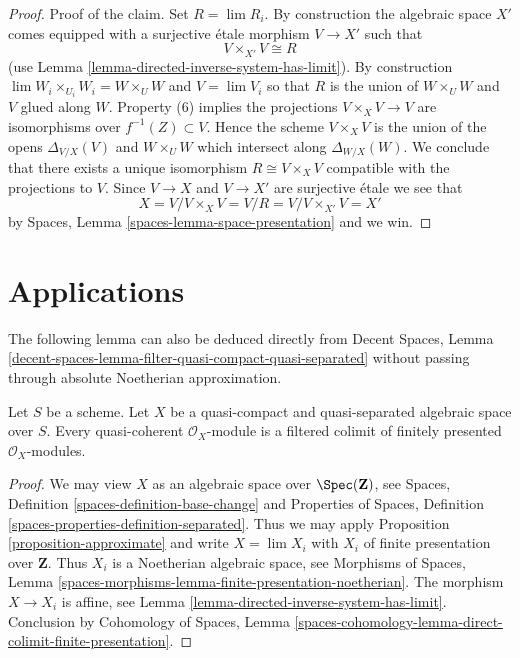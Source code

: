 \begin{proof}
\medskip\noindent
Proof of the claim. Set $R = \lim R_i$.
By construction the algebraic space $X'$ comes
equipped with a surjective \'etale morphism $V \to X'$ such that
$$
V \times_{X'} V \cong R
$$
(use Lemma \ref{lemma-directed-inverse-system-has-limit}).
By construction $\lim W_i \times_{U_i} W_i = W \times_U W$ and $V = \lim V_i$
so that $R$ is the union of $W \times_U W$ and $V$ glued along $W$.
Property (6) implies the projections $V \times_X V \to V$ are isomorphisms
over $f^{-1}(Z) \subset V$. Hence the scheme $V \times_X V$ is the union
of the opens $\Delta_{V/X}(V)$ and $W \times_U W$ which intersect
along $\Delta_{W/X}(W)$. We conclude that there exists a unique isomorphism
$R \cong V \times_X V$ compatible with the projections to $V$.
Since $V \to X$ and $V \to X'$ are surjective \'etale we see that
$$
X = V/ V \times_X V = V/R = V/V \times_{X'} V = X'
$$
by Spaces, Lemma \ref{spaces-lemma-space-presentation} and we win.
\end{proof}




\section{Applications}
\label{section-applications}

\noindent
The following lemma can also be deduced directly from
Decent Spaces, Lemma
\ref{decent-spaces-lemma-filter-quasi-compact-quasi-separated}
without passing through absolute Noetherian approximation.

\begin{lemma}
\label{lemma-colimit-finitely-presented}
Let $S$ be a scheme. Let $X$ be a quasi-compact and quasi-separated algebraic
space over $S$. Every quasi-coherent $\mathcal{O}_X$-module is a
filtered colimit of finitely presented $\mathcal{O}_X$-modules.
\end{lemma}

\begin{proof}
We may view $X$ as an algebraic space over $\Spec(\mathbf{Z})$, see
Spaces, Definition \ref{spaces-definition-base-change} and
Properties of Spaces, Definition \ref{spaces-properties-definition-separated}.
Thus we may apply Proposition \ref{proposition-approximate}
and write $X = \lim X_i$ with $X_i$ of finite presentation over $\mathbf{Z}$.
Thus $X_i$ is a Noetherian algebraic space, see
Morphisms of Spaces, Lemma
\ref{spaces-morphisms-lemma-finite-presentation-noetherian}.
The morphism $X \to X_i$ is affine, see
Lemma \ref{lemma-directed-inverse-system-has-limit}.
Conclusion by
Cohomology of Spaces, Lemma
\ref{spaces-cohomology-lemma-direct-colimit-finite-presentation}.
\end{proof}

